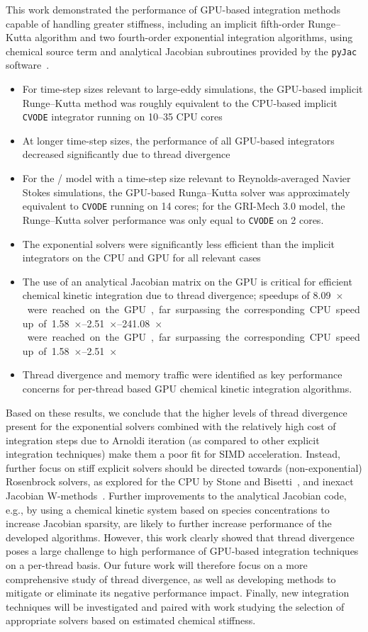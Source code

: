 \documentclass[preprint]{elsarticle}
\begin{document}
This work demonstrated the performance of GPU-based integration methods capable of handling greater stiffness, including an implicit fifth-order Runge--Kutta algorithm and two fourth-order exponential integration algorithms, using chemical source term and analytical Jacobian subroutines provided by the \texttt{pyJac} software~\cite{niemeyer_2016_51139,Niemeyer:2015ws,Niemeyer:2016aa}.
\begin{itemize}
 \item For time-step sizes relevant to large-eddy simulations, the GPU-based implicit Runge--Kutta method was roughly equivalent to the CPU-based implicit \texttt{CVODE} integrator running on \numrange{10}{35} CPU cores
 \item At longer time-step sizes, the performance of all GPU-based integrators decreased significantly due to thread divergence
 \item For the \slash{} model with a time-step size relevant to Reynolds-averaged Navier Stokes simulations, the GPU-based Runga--Kutta solver was approximately equivalent to \texttt{CVODE} running on \num{14} cores; for the GRI-Mech 3.0 model, the Runge--Kutta solver performance was only equal to \texttt{CVODE} on \num{2} cores.
 \item The exponential solvers were significantly less efficient than the implicit integrators on the CPU and GPU for all relevant cases
 \item The use of an analytical Jacobian matrix on the GPU is critical for efficient chemical kinetic integration due to thread divergence; speedups of \SIrange{8.09}{241.08}{$\times$} were reached on the GPU, far surpassing the corresponding CPU speedup of \SIrange{1.58}{2.51}{$\times$}
 \item Thread divergence and memory traffic were identified as key performance concerns for per-thread based GPU chemical kinetic integration algorithms.
 \end{itemize}
Based on these results, we conclude that the higher levels of thread divergence present for the exponential solvers combined with the relatively high cost of integration steps due to Arnoldi iteration (as compared to other explicit integration techniques) make them a poor fit for SIMD acceleration.
Instead, further focus on stiff explicit solvers should be directed towards (non-exponential) Rosenbrock solvers, as explored for the CPU by Stone and Bisetti~\cite{stone2014comparison}, and inexact Jacobian W-methods~\cite{Schmitt2004,steihaug1979attempt}.
Further improvements to the analytical Jacobian code, e.g., by using a chemical kinetic system based on species concentrations to increase Jacobian sparsity, are likely to further increase performance of the developed algorithms.
However, this work clearly showed that thread divergence poses a large challenge to high performance of GPU-based integration techniques on a per-thread basis.
Our future work will therefore focus on a more comprehensive study of thread divergence, as well as developing methods to mitigate or eliminate its negative performance impact.
Finally, new integration techniques will be investigated and paired with work studying the selection of appropriate solvers based on estimated chemical stiffness.
\end{document}
